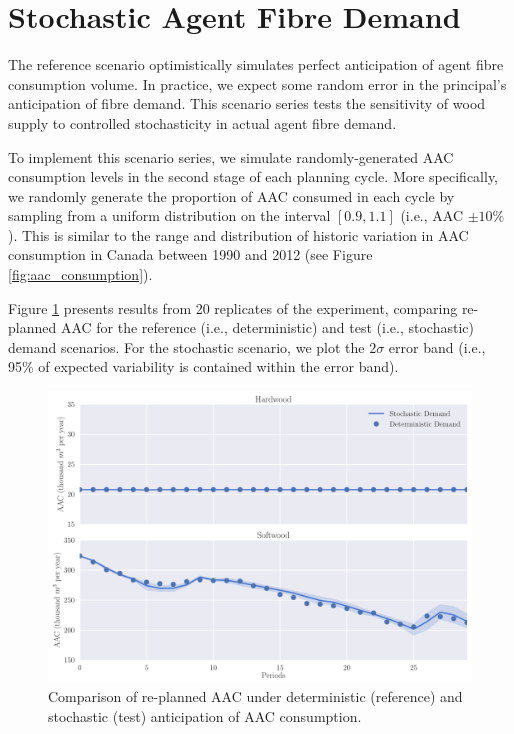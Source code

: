 \section{Stochastic Agent Fibre Demand}
\label{sec:scenario_series_6}

The reference scenario optimistically simulates perfect anticipation of agent fibre consumption volume. In practice, we expect some random error in the principal's anticipation of fibre demand. This scenario series tests the sensitivity of wood supply to controlled stochasticity in actual agent fibre demand.


To implement this scenario series, we simulate randomly-generated AAC consumption levels in the second stage of each planning cycle. More specifically, we randomly generate the proportion of AAC consumed in each cycle by sampling from a uniform distribution on the interval $[0.9, 1.1]$ (i.e., AAC $\pm 10\%$). This is similar to the range and distribution of historic variation in AAC consumption in Canada between 1990 and 2012 (see Figure \ref{fig:aac_consumption}).

Figure \ref{fig:scenario_series_6} presents results from 20 replicates of the experiment, comparing re-planned AAC for the reference (i.e., deterministic) and test (i.e., stochastic) demand scenarios. For the stochastic scenario, we plot the $2\sigma$ error band (i.e., 95\% of expected variability is contained within the error band). 

\begin{figure}[H]
  \centering
  \includegraphics[width=\textwidth]{images/tsplot_2sigma}
  \caption{Comparison of re-planned AAC under deterministic (reference) and stochastic (test) anticipation of AAC consumption.}
  \label{fig:scenario_series_6}
\end{figure}
 
